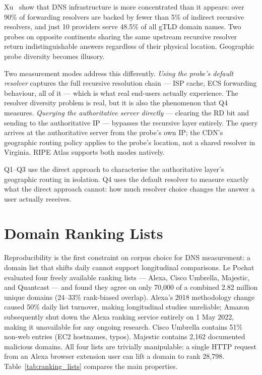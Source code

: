 Xu~\cite{Xu2023} show that \ac{DNS} infrastructure is more concentrated than it appears: over 90\% of forwarding resolvers are backed by fewer than 5\% of indirect recursive resolvers, and just 10 providers serve 48.5\% of all g\ac{TLD} domain names. Two probes on opposite continents sharing the same upstream recursive resolver return indistinguishable answers regardless of their physical location. Geographic probe diversity becomes illusory.

Two measurement modes address this differently. \textit{Using the probe's default resolver} captures the full recursive resolution chain --- \ac{ISP} cache, \ac{ECS} forwarding behaviour, all of it --- which is what real end-users actually experience. The resolver diversity problem is real, but it is also the phenomenon that Q4 measures. \textit{Querying the authoritative server directly} --- clearing the \ac{RD} bit and sending to the authoritative \ac{IP} --- bypasses the recursive layer entirely. The query arrives at the authoritative server from the probe's own \ac{IP}; the \ac{CDN}'s geographic routing policy applies to the probe's location, not a shared resolver in Virginia. RIPE Atlas supports both modes natively.

Q1--Q3 use the direct approach to characterise the authoritative layer's geographic routing in isolation. Q4 uses the default resolver to measure exactly what the direct approach cannot: how much resolver choice changes the answer a user actually receives.

\section{Domain Ranking Lists}
\label{sec:2.6}

Reproducibility is the first constraint on corpus choice for \ac{DNS} measurement: a domain list that shifts daily cannot support longitudinal comparisons. Le Pochat~\cite{LePochat2019} evaluated four freely available ranking lists — Alexa, Cisco Umbrella, Majestic, and Quantcast — and found they agree on only 70,000 of a combined 2.82 million unique domains (24–33\% rank-biased overlap). Alexa's 2018 methodology change caused 50\% daily list turnover, making longitudinal studies unreliable; Amazon subsequently shut down the Alexa ranking service entirely on 1 May 2022, making it unavailable for any ongoing research. Cisco Umbrella contains 51\% non-web entries (EC2 hostnames, typos). Majestic contains 2,162 documented malicious domains. All four lists are trivially manipulable: a single \ac{HTTP} request from an Alexa browser extension user can lift a domain to rank 28,798. Table~\ref{tab:ranking_lists} compares the main properties.

